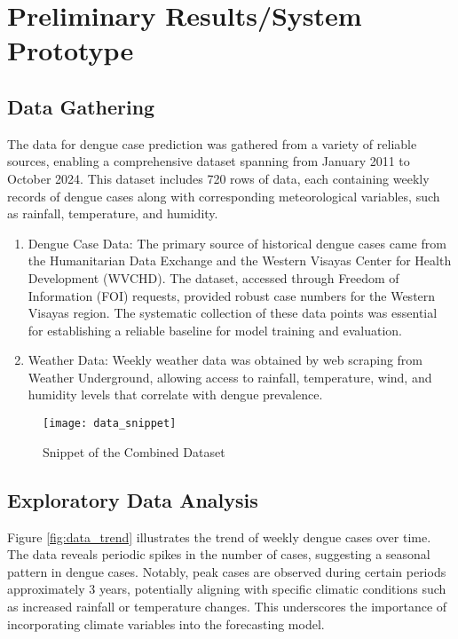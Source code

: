 \chapter{Preliminary Results/System Prototype}
\section{Data Gathering}
The data for dengue case prediction was gathered from a variety of reliable sources, enabling a comprehensive dataset spanning from January 2011 to October 2024. This dataset includes 720 rows of data, each containing weekly records of dengue cases along with corresponding meteorological variables, such as rainfall, temperature, and humidity.
\begin{enumerate}
	\item Dengue Case Data: The primary source of historical dengue cases came from the Humanitarian Data Exchange and the Western Visayas Center for Health Development (WVCHD). The dataset, accessed through Freedom of Information (FOI) requests, provided robust case numbers for the Western Visayas region. The systematic collection of these data points was essential for establishing a reliable baseline for model training and evaluation.
	\item Weather Data: Weekly weather data was obtained by web scraping from Weather Underground, allowing access to rainfall, temperature, wind, and humidity levels that correlate with dengue prevalence.
\end{enumerate}

\begin{figure}[ht]
	\centering
	\texttt{[image: data\_snippet]}
	\caption{Snippet of the Combined Dataset}
	\label{fig:data_snippet}
\end{figure}

\section{Exploratory Data Analysis}

Figure \ref{fig:data_trend} illustrates the trend of weekly dengue cases over time. The data reveals periodic spikes in the number of cases, suggesting a seasonal pattern in dengue cases. Notably, peak cases are observed during certain periods approximately 3 years, potentially aligning with specific climatic conditions such as increased rainfall or temperature changes. This underscores the importance of incorporating climate variables into the forecasting model.


